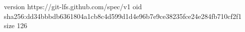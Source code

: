 version https://git-lfs.github.com/spec/v1
oid sha256:dd34bbbdb6361804a1cb8c4d599d1d4e96b7e9ce38235fce24e284fb710cf2f1
size 126
